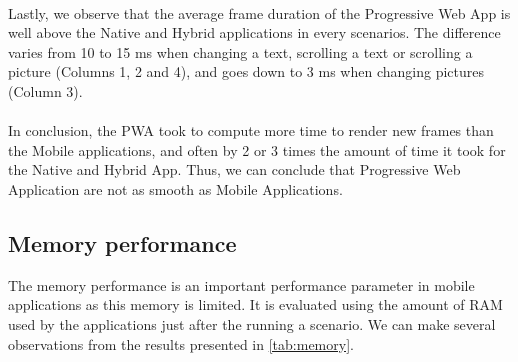 \documentclass{kththesis}
\begin{document}
\paragraph{}
Lastly, we observe that the average frame duration of the Progressive Web App is well above the Native and Hybrid applications in every scenarios. The difference varies from 10 to 15 ms when changing a text, scrolling a text or scrolling a picture (Columns 1, 2 and 4), and goes down to 3 ms when changing pictures (Column 3). 

\paragraph{}
In conclusion, the PWA took to compute more time to render new frames than the Mobile applications, and often by 2 or 3 times the amount of time it took for the Native and Hybrid App. Thus, we can conclude that Progressive Web Application are not as smooth as Mobile Applications.

\subsection{Memory performance}

The memory performance is an important performance parameter in mobile applications as this memory is limited. It is evaluated using the amount of RAM used by the applications just after the running a scenario. We can make several observations from the results presented in \autoref{tab:memory}. 
\end{document}
